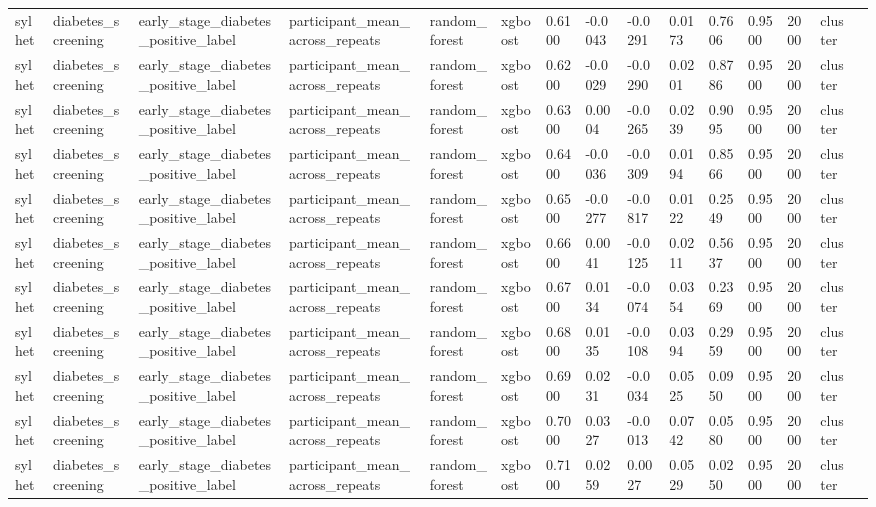 \begin{tabular}{lllllllllllllll}
sylhet & diabetes\_screening & early\_stage\_diabetes\_positive\_label & participant\_mean\_across\_repeats & random\_forest & xgboost & 0.6100 & -0.0043 & -0.0291 & 0.0173 & 0.7606 & 0.9500 & 2000 & cluster &  \\
sylhet & diabetes\_screening & early\_stage\_diabetes\_positive\_label & participant\_mean\_across\_repeats & random\_forest & xgboost & 0.6200 & -0.0029 & -0.0290 & 0.0201 & 0.8786 & 0.9500 & 2000 & cluster &  \\
sylhet & diabetes\_screening & early\_stage\_diabetes\_positive\_label & participant\_mean\_across\_repeats & random\_forest & xgboost & 0.6300 & 0.0004 & -0.0265 & 0.0239 & 0.9095 & 0.9500 & 2000 & cluster &  \\
sylhet & diabetes\_screening & early\_stage\_diabetes\_positive\_label & participant\_mean\_across\_repeats & random\_forest & xgboost & 0.6400 & -0.0036 & -0.0309 & 0.0194 & 0.8566 & 0.9500 & 2000 & cluster &  \\
sylhet & diabetes\_screening & early\_stage\_diabetes\_positive\_label & participant\_mean\_across\_repeats & random\_forest & xgboost & 0.6500 & -0.0277 & -0.0817 & 0.0122 & 0.2549 & 0.9500 & 2000 & cluster &  \\
sylhet & diabetes\_screening & early\_stage\_diabetes\_positive\_label & participant\_mean\_across\_repeats & random\_forest & xgboost & 0.6600 & 0.0041 & -0.0125 & 0.0211 & 0.5637 & 0.9500 & 2000 & cluster &  \\
sylhet & diabetes\_screening & early\_stage\_diabetes\_positive\_label & participant\_mean\_across\_repeats & random\_forest & xgboost & 0.6700 & 0.0134 & -0.0074 & 0.0354 & 0.2369 & 0.9500 & 2000 & cluster &  \\
sylhet & diabetes\_screening & early\_stage\_diabetes\_positive\_label & participant\_mean\_across\_repeats & random\_forest & xgboost & 0.6800 & 0.0135 & -0.0108 & 0.0394 & 0.2959 & 0.9500 & 2000 & cluster &  \\
sylhet & diabetes\_screening & early\_stage\_diabetes\_positive\_label & participant\_mean\_across\_repeats & random\_forest & xgboost & 0.6900 & 0.0231 & -0.0034 & 0.0525 & 0.0950 & 0.9500 & 2000 & cluster &  \\
sylhet & diabetes\_screening & early\_stage\_diabetes\_positive\_label & participant\_mean\_across\_repeats & random\_forest & xgboost & 0.7000 & 0.0327 & -0.0013 & 0.0742 & 0.0580 & 0.9500 & 2000 & cluster &  \\
sylhet & diabetes\_screening & early\_stage\_diabetes\_positive\_label & participant\_mean\_across\_repeats & random\_forest & xgboost & 0.7100 & 0.0259 & 0.0027 & 0.0529 & 0.0250 & 0.9500 & 2000 & cluster &  \\

\end{tabular}
